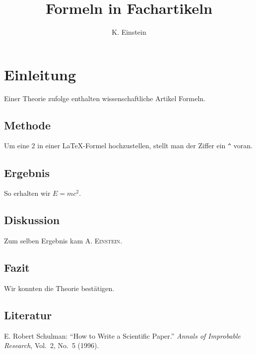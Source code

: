 \documentclass[a4paper]{article}
\begin{document}
	\author{K. Einstein}
	\title{Formeln in Fachartikeln}

	\tableofcontents
	
	\maketitle
	
	\section{Einleitung}
	Einer Theorie zufolge enthalten wissenschaftliche Artikel Formeln.

	\subsection{Methode}
	Um eine 2 in einer \LaTeX-Formel hochzustellen, stellt man der Ziffer ein \verb+^+ voran.

	\subsection{Ergebnis}
	So erhalten wir \(E=mc^2\).
	
	\subsection{Diskussion}
	Zum selben Ergebnis kam \textsc{A. Einstein}.

	\subsection{Fazit}
	Wir konnten die Theorie bestätigen.

	\subsection*{Literatur}
	E. Robert Schulman: ``How to Write a Scientific Paper.'' \textit{Annals of Improbable Research}, Vol.~2, No.~5 (1996).
	
	
\end{document}
